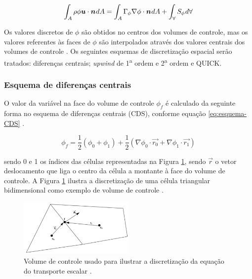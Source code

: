 \begin{equation}
    \label{eq:volumes-finitos-estacionaria}
    \int_{A} \rho\phi\boldsymbol{u}\cdot\boldsymbol{n}\hspace{0.5pt} dA = \int_{A} \Gamma_{\phi}\nabla\phi\cdot\boldsymbol{n}\hspace{0.5pt} dA + \int_{\forall} S_{\phi}\hspace{0.5pt} d\forall
\end{equation}

Os valores discretos de \(\phi\) são obtidos no centros dos volumes de controle, mas os valores referentes às faces de \(\phi\) são interpolados através dos valores centrais dos volumes de controle \cite{Rezende2009}. Os seguintes esquemas de discretização espacial serão tratados: diferenças centrais; \textit{upwind} de 1\textsuperscript{a} ordem e 2\textsuperscript{a} ordem e QUICK.

\subsubsection{Esquema de diferenças centrais}

O valor da variável na face do volume de controle \(\phi_{f}\) é calculado da seguinte forma no esquema de diferenças centrais (CDS), conforme equação \ref{eq:esquema-CDS} \cite{Rezende2009}.

\begin{equation}
    \label{eq:esquema-CDS}
    \phi_f = \frac{1}{2}\left(\phi_0+\phi_1\right)+\frac{1}{2}\left(\nabla\phi_0\cdot\overrightarrow{r_0}+\nabla\phi_1\cdot\overrightarrow{r_1}\right)
\end{equation}

sendo 0 e 1 os índices das células representadas na Figura \ref{fig:volume-ANSYS-2021R2}, sendo \(\overrightarrow{r}\) o vetor deslocamento que liga o centro da célula a montante à face do volume de controle. A Figura \ref{fig:volume-ANSYS-2021R2} ilustra a discretização de uma célula triangular bidimensional como exemplo de volume de controle \cite{fluent2021ansys}.

\begin{figure}[!ht] 
	\centering
	\includegraphics[width=0.5\textwidth]{foto01-volume-fluent.png}
    \caption[Volume de controle usado para ilustrar a discretização da equação do transporte escalar.]{Volume de controle usado para ilustrar a discretização da equação do transporte escalar \cite{fluent2021ansys}.}
	\label{fig:volume-ANSYS-2021R2}
\end{figure}

